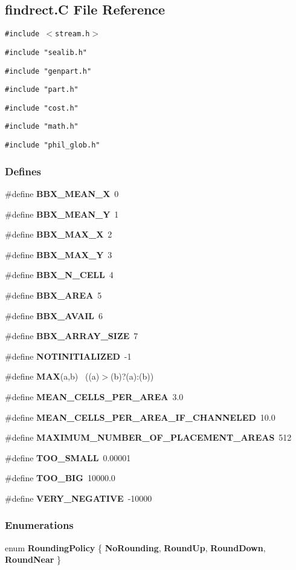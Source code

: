 \subsection{findrect.C File Reference}
\label{findrect.C}
{\tt \#include $<$stream.h$>$}\par
{\tt \#include "sealib.h"}\par
{\tt \#include "genpart.h"}\par
{\tt \#include "part.h"}\par
{\tt \#include "cost.h"}\par
{\tt \#include "math.h"}\par
{\tt \#include "phil\_\-glob.h"}\par
\subsubsection*{Defines}
\begin{CompactItemize}
\item 
\#define {\bf BBX\_\-MEAN\_\-X}\ 0
\item 
\#define {\bf BBX\_\-MEAN\_\-Y}\ 1
\item 
\#define {\bf BBX\_\-MAX\_\-X}\ 2
\item 
\#define {\bf BBX\_\-MAX\_\-Y}\ 3
\item 
\#define {\bf BBX\_\-N\_\-CELL}\ 4
\item 
\#define {\bf BBX\_\-AREA}\ 5
\item 
\#define {\bf BBX\_\-AVAIL}\ 6
\item 
\#define {\bf BBX\_\-ARRAY\_\-SIZE}\ 7
\item 
\#define {\bf NOTINITIALIZED}\ -1
\item 
\#define {\bf MAX}(a,b) \ ((a)$>$(b)?(a):(b))
\item 
\#define {\bf MEAN\_\-CELLS\_\-PER\_\-AREA}\ 3.0
\item 
\#define {\bf MEAN\_\-CELLS\_\-PER\_\-AREA\_\-IF\_\-CHANNELED}\ 10.0
\item 
\#define {\bf MAXIMUM\_\-NUMBER\_\-OF\_\-PLACEMENT\_\-AREAS}\ 512
\item 
\#define {\bf TOO\_\-SMALL}\ 0.00001
\item 
\#define {\bf TOO\_\-BIG}\ 10000.0
\item 
\#define {\bf VERY\_\-NEGATIVE}\ -10000
\end{CompactItemize}
\subsubsection*{Enumerations}
\begin{CompactItemize}
\item 
enum {\bf Rounding\-Policy} \{ {\bf No\-Rounding}, 
{\bf Round\-Up}, 
{\bf Round\-Down}, 
{\bf Round\-Near}
 \}
\end{CompactItemize}
